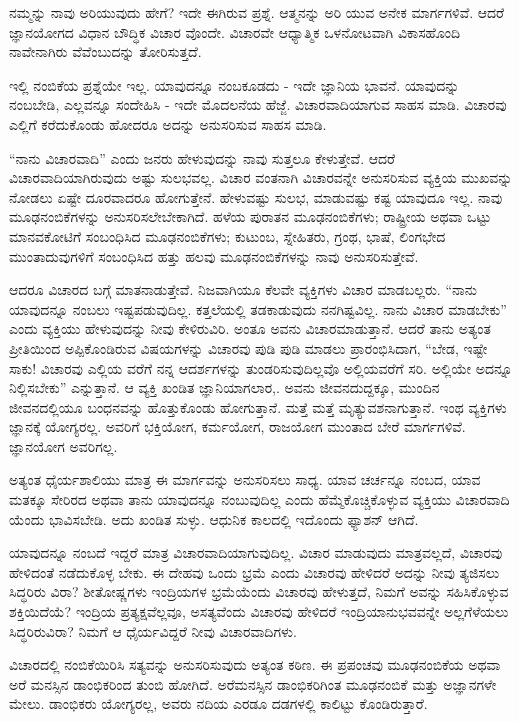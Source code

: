 ನಮ್ಮನ್ನು ನಾವು ಅರಿಯುವುದು ಹೇಗೆ? ಇದೇ ಈಗಿರುವ ಪ್ರಶ್ನೆ. ಆತ್ಮನನ್ನು ಅರಿ ಯುವ ಅನೇಕ ಮಾರ್ಗಗಳಿವೆ. ಆದರೆ ಜ್ಞಾನಯೋಗದ ವಿಧಾನ ಬೌದ್ಧಿಕ ವಿಚಾರ ವೊಂದೇ. ವಿಚಾರವೇ ಆಧ್ಯಾತ್ಮಿಕ ಒಳನೋಟವಾಗಿ ವಿಕಾಸಹೊಂದಿ ನಾವೇನಾಗಿರು ವೆವೆಂಬುದನ್ನು ತೋರಿಸುತ್ತದೆ.

ಇಲ್ಲಿ ನಂಬಿಕೆಯ ಪ್ರಶ್ನೆಯೇ ಇಲ್ಲ. ಯಾವುದನ್ನೂ ನಂಬಕೂಡದು - ಇದೇ ಜ್ಞಾನಿಯ ಭಾವನೆ. ಯಾವುದನ್ನು ನಂಬಬೇಡಿ, ಎಲ್ಲವನ್ನೂ ಸಂದೇಹಿಸಿ - ಇದೇ ಮೊದಲನೆಯ ಹೆಜ್ಜೆ. ವಿಚಾರವಾದಿಯಾಗುವ ಸಾಹಸ ಮಾಡಿ. ವಿಚಾರವು ಎಲ್ಲಿಗೆ ಕರೆದುಕೊಂಡು ಹೋದರೂ ಅದನ್ನು ಅನುಸರಿಸುವ ಸಾಹಸ ಮಾಡಿ.

“ನಾನು ವಿಚಾರವಾದಿ” ಎಂದು ಜನರು ಹೇಳುವುದನ್ನು ನಾವು ಸುತ್ತಲೂ ಕೇಳುತ್ತೇವೆ. ಆದರೆ ವಿಚಾರವಾದಿಯಾಗಿರುವುದು ಅಷ್ಟು ಸುಲಭವಲ್ಲ. ವಿಚಾರ ವಂತನಾಗಿ ವಿಚಾರವನ್ನೇ ಅನುಸರಿಸುವ ವ್ಯಕ್ತಿಯ ಮುಖವನ್ನು ನೋಡಲು ಏಷ್ಟೇ ದೂರವಾದರೂ ಹೋಗುತ್ತೇನೆ. ಹೇಳುವಷ್ಟು ಸುಲಭ, ಮಾಡುವಷ್ಟು ಕಷ್ಟ ಯಾವುದೂ ಇಲ್ಲ. ನಾವು ಮೂಢನಂಬಿಕೆಗಳನ್ನು ಅನುಸರಿಸಲೇಬೇಕಾಗಿದೆ. ಹಳೆಯ ಪುರಾತನ ಮೂಢನಂಬಿಕೆಗಳು; ರಾಷ್ಟ್ರೀಯ ಅಥವಾ ಒಟ್ಟು ಮಾನವಕೋಟಿಗೆ ಸಂಬಂಧಿಸಿದ ಮೂಢನಂಬಿಕೆಗಳು; ಕುಟುಂಬ, ಸ್ನೇಹಿತರು, ಗ್ರಂಥ, ಭಾಷೆ, ಲಿಂಗಭೇದ ಮುಂತಾದುವುಗಳಿಗೆ ಸಂಬಂಧಿಸಿದ ಹತ್ತು ಹಲವು ಮೂಢನಂಬಿಕೆಗಳನ್ನು ನಾವು ಅನುಸರಿಸುತ್ತೇವೆ.

ಆದರೂ ವಿಚಾರದ ಬಗ್ಗೆ ಮಾತನಾಡುತ್ತೇವೆ. ನಿಜವಾಗಿಯೂ ಕೆಲವೇ ವ್ಯಕ್ತಿಗಳು ವಿಚಾರ ಮಾಡಬಲ್ಲರು. “ನಾನು ಯಾವುದನ್ನೂ ನಂಬಲು ಇಷ್ಟಪಡುವುದಿಲ್ಲ. ಕತ್ತಲೆಯಲ್ಲಿ ತಡಕಾಡುವುದು ನನಗಿಷ್ಟವಿಲ್ಲ. ನಾನು ವಿಚಾರ ಮಾಡಬೇಕು” ಎಂದು ವ್ಯಕ್ತಿಯು ಹೇಳುವುದನ್ನು ನೀವು ಕೇಳಿರುವಿರಿ. ಅಂತೂ ಅವನು ವಿಚಾರಮಾಡುತ್ತಾನೆ. ಆದರೆ ತಾನು ಅತ್ಯಂತ ಪ್ರೀತಿಯಿಂದ ಅಪ್ಪಿಕೊಂಡಿರುವ ವಿಷಯಗಳನ್ನು ವಿಚಾರವು ಪುಡಿ ಪುಡಿ ಮಾಡಲು ಪ್ರಾರಂಭಿಸಿದಾಗ, “ಬೇಡ, ಇಷ್ಟೇ ಸಾಕು! ವಿಚಾರವು ಎಲ್ಲಿಯ ವರೆಗೆ ನನ್ನ ಆದರ್ಶಗಳನ್ನು ತುಂಡರಿಸುವುದಿಲ್ಲವೊ ಅಲ್ಲಿಯವರೆಗೆ ಸರಿ. ಅಲ್ಲಿಯೇ ಅದನ್ನೂ ನಿಲ್ಲಿಸಬೇಕು” ಎನ್ನುತ್ತಾನೆ. ಆ ವ್ಯಕ್ತಿ ಖಂಡಿತ ಜ್ಞಾನಿಯಾಗಲಾರ,. ಅವನು ಜೀವನದುದ್ದಕ್ಕೂ, ಮುಂದಿನ ಜೀವನದಲ್ಲಿಯೂ ಬಂಧನವನ್ನು ಹೊತ್ತುಕೊಂಡು ಹೋಗುತ್ತಾನೆ. ಮತ್ತೆ ಮತ್ತೆ ಮೃತ್ಯುವಶನಾಗುತ್ತಾನೆ. ಇಂಥ ವ್ಯಕ್ತಿಗಳು ಜ್ಞಾನಕ್ಕೆ ಯೋಗ್ಯರಲ್ಲ. ಅವರಿಗೆ ಭಕ್ತಿಯೋಗ, ಕರ್ಮಯೋಗ, ರಾಜಯೋಗ ಮುಂತಾದ ಬೇರೆ ಮಾರ್ಗಗಳಿವೆ. ಜ್ಞಾನಯೋಗ ಅವರಿಗಲ್ಲ.

ಅತ್ಯಂತ ಧೈರ್ಯಶಾಲಿಯು ಮಾತ್ರ ಈ ಮಾರ್ಗವನ್ನು ಅನುಸರಿಸಲು ಸಾಧ್ಯ. ಯಾವ ಚರ್ಚನ್ನೂ ನಂಬದ, ಯಾವ ಮತಕ್ಕೂ ಸೇರಿರದ ಅಥವಾ ತಾನು ಯಾವುದನ್ನೂ ನಂಬುವುದಿಲ್ಲ ಎಂದು ಹೆಮ್ಮೆಕೊಚ್ಚಿಕೊಳ್ಳುವ ವ್ಯಕ್ತಿಯು ವಿಚಾರವಾದಿ ಯೆಂದು ಭಾವಿಸಬೇಡಿ. ಅದು ಖಂಡಿತ ಸುಳ್ಳು. ಆಧುನಿಕ ಕಾಲದಲ್ಲಿ ಇದೊಂದು ಫ್ಯಾಶನ್ ಆಗಿದೆ.

ಯಾವುದನ್ನೂ ನಂಬದೆ ಇದ್ದರೆ ಮಾತ್ರ ವಿಚಾರವಾದಿಯಾಗುವುದಿಲ್ಲ. ವಿಚಾರ ಮಾಡುವುದು ಮಾತ್ರವಲ್ಲದೆ, ವಿಚಾರವು ಹೇಳಿದಂತೆ ನಡೆದುಕೊಳ್ಳ ಬೇಕು. ಈ ದೇಹವು ಒಂದು ಭ್ರಮೆ ಎಂದು ವಿಚಾರವು ಹೇಳಿದರೆ ಅದನ್ನು ನೀವು ತ್ಯಜಿಸಲು ಸಿದ್ಧರಿರು ವಿರಾ? ಶೀತೋಷ್ಣಗಳು ಇಂದ್ರಿಯಗಳ ಭ್ರಮೆಯೆಂದು ವಿಚಾರವು ಹೇಳುತ್ತದೆ, ನಿಮಗೆ ಅವನ್ನು ಸಹಿಸಿಕೊಳ್ಳುವ ಶಕ್ತಿಯಿದೆಯೆ? ಇಂದ್ರಿಯ ಪ್ರತ್ಯಕ್ಷವೆಲ್ಲವೂ, ಅಸತ್ಯವೆಂದು ವಿಚಾರವು ಹೇಳಿದರೆ ಇಂದ್ರಿಯಾನುಭವವನ್ನೇ ಅಲ್ಲಗೆಳೆಯಲು ಸಿದ್ಧರಿರುವಿರಾ? ನಿಮಗೆ ಆ ಧೈರ್ಯವಿದ್ದರೆ ನೀವು ವಿಚಾರವಾದಿಗಳು.

ವಿಚಾರದಲ್ಲಿ ನಂಬಿಕೆಯಿರಿಸಿ ಸತ್ಯವನ್ನು ಅನುಸರಿಸುವುದು ಅತ್ಯಂತ ಕಠಿಣ. ಈ ಪ್ರಪಂಚವು ಮೂಢನಂಬಿಕೆಯ ಅಥವಾ ಅರೆ ಮನಸ್ಸಿನ ಡಾಂಭಿಕರಿಂದ ತುಂಬಿ ಹೋಗಿದೆ. ಅರೆಮನಸ್ಸಿನ ಡಾಂಭಿಕರಿಗಿಂತ ಮೂಢನಂಬಿಕೆ ಮತ್ತು ಅಜ್ಞಾನಗಳೇ ಮೇಲು. ಡಾಂಭಿಕರು ಯೋಗ್ಯರಲ್ಲ, ಅವರು ನದಿಯ ಎರಡೂ ದಡಗಳಲ್ಲಿ ಕಾಲಿಟ್ಟು ಕೊಂಡಿರುತ್ತಾರೆ.

